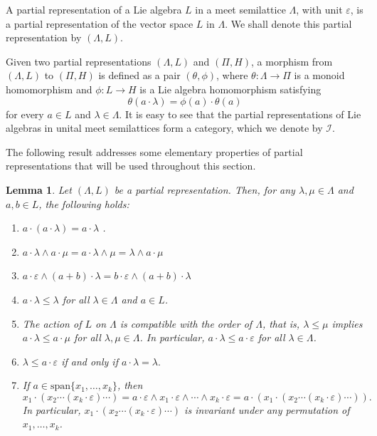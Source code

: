\documentclass{amsart}
\newcommand{\0}{{\vartheta}}
\newtheorem{lem}[thm]{Lemma}
\theoremstyle{definition}
\theoremstyle{remark}
\numberwithin{equation}{section}
\newtheorem*{Theorem A}{\textbf{Theorem A}}
\newtheorem*{Corollary E}{\textbf{Corollary E}}
\newtheorem*{Corollary F}{\textbf{Corollary F}}
\newtheorem*{Theorem B}{\textbf{Theorem B}}
\newtheorem*{Theorem C}{\textbf{Theorem C}}
\newtheorem*{Theorem D}{\textbf{Theorem B}}
\newtheorem*{p a}{\textbf{Proof of  Theorem A}}
\newtheorem*{p b}{\textbf{Proof of Theorem B}}
\newtheorem*{p c}{\textbf{Proof of  Theorem C}}
\newtheorem*{p d}{\textbf{Proof of  Theorem D}}
\begin{document}
A partial representation of a Lie algebra $L$ in a meet semilattice $\Lambda$, with unit $\varepsilon$, is a  partial representation of the vector space $L$ in $\Lambda$. We shall denote this partial representation by $(\Lambda, L)$. 

Given two partial representations $(\Lambda,L)$ and $(\Pi,H)$, a morphism from $(\Lambda,L)$ to $(\Pi,H)$ is defined as a pair $(\theta,\phi)$, where $\theta:\Lambda\to \Pi$ is a monoid homomorphism and $\phi:L\to H$ is a Lie algebra homomorphism satisfying
$$\theta(a\cdot \lambda)=\phi(a)\cdot \theta(a)$$
for every $a\in L$ and $\lambda\in \Lambda.$ It is easy to see that the partial representations of Lie algebras in unital meet semilattices form a category, which we denote by $\mathcal{I}.$ 

The following result addresses some elementary properties of partial representations that will be used throughout this section.
\begin{lem}\label{lemma-fp}
Let $(\Lambda,L)$ be a partial representation. Then, for any $\lambda,\mu\in \Lambda$ and $a,b\in L$, the following holds:
\begin{enumerate}
 \item $a\cdot(a\cdot \lambda)=a\cdot\lambda$ . 
\item $a\cdot\lambda\wedge a\cdot\mu=a\cdot \lambda\wedge \mu=\lambda\wedge a\cdot \mu$   
   \item $a\cdot\varepsilon \wedge (a+b)\cdot\lambda =b\cdot\varepsilon \wedge (a+b)\cdot\lambda$
    \item  $a\cdot \lambda\leq \lambda$ for all $\lambda\in \Lambda$ and $a\in L$.
    \item The action of $L$ on $\Lambda$ is compatible with the order of $\Lambda$, that is, $\lambda\leq \mu$ implies  $a\cdot \lambda\leq a\cdot \mu$ for all $\lambda,\mu\in \Lambda$. In particular, $a\cdot \lambda\leq a\cdot \varepsilon$ for all $\lambda\in \Lambda$.
    \item $\lambda\leq a\cdot \varepsilon $ if and only if $a\cdot\lambda=\lambda.$
    \item If $a\in \text{span}\{x_1,\ldots,x_k\}$, then
\begin{equation}\label{eq-action}
    x_1\cdot(x_2\cdots(x_k\cdot \varepsilon )\cdots )=a\cdot \varepsilon\wedge x_1\cdot\varepsilon\wedge\cdots \wedge x_k\cdot \varepsilon=a\cdot(x_1\cdot(x_2\cdots(x_k\cdot \varepsilon  )  \cdots )).
\end{equation}
In particular, $x_1\cdot(x_2\cdots(x_k\cdot \varepsilon)\cdots)$ is invariant under any permutation of $x_1,\ldots,x_k$.
\end{enumerate}
\end{lem}
\end{document}
